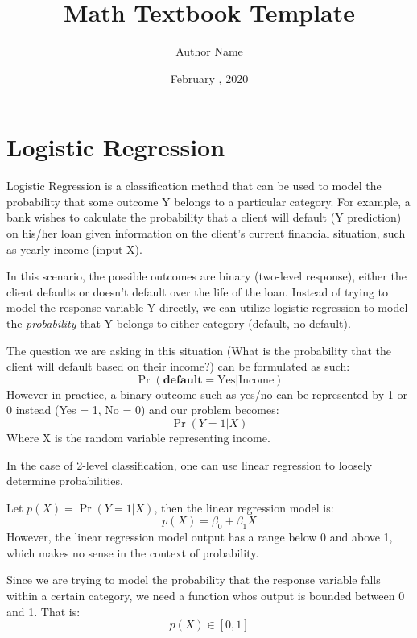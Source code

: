 \documentclass{article}
\title{Math Textbook Template}
\author{Author Name}
\date{February \nth{16}, 2020}
\numberwithin{equation}{subsection}
\begin{document}
\maketitle
\tableofcontents 
\newpage 

\section{Logistic Regression}
Logistic Regression is a classification method that can 
be used to model the probability that some outcome Y belongs to
a particular category.
For example, a bank wishes to calculate the probability that a
client will default (Y prediction) on his/her loan given information on
the client's current financial situation, such as yearly income (input X).

In this scenario, the possible outcomes are binary (two-level response), 
either the client defaults or doesn't default 
over the life of the loan. Instead of trying to model the response
variable Y directly, we can utilize logistic regression to model 
the \textit{probability} that Y belongs to either category (default, 
no default).

The question we are asking in this situation (What is the probability that
the client will default based on their income?) can be formulated as such:
\begin{equation}
\Pr(\textbf{default} = \text{Yes} | \text{Income}) \label{prdefault}
\end{equation}
However in practice, a binary outcome such as yes/no can be represented by 1
or 0 instead (Yes = 1, No = 0) and our problem becomes:
\begin{equation}
\Pr(Y = 1 | X)
\end{equation}
Where X is the random variable representing income.

In the case of 2-level classification, one can use linear regression to loosely determine
probabilities.

Let $p(X) = \Pr(Y=1|X)$, then the linear regression model is:
\begin{equation}
p(X) = \beta_0 + \beta_1X
\end{equation}
However, the linear regression model output has a range below 0 and above 1,
which makes no sense in the context of probability. 

Since we are trying to model the probability that the response variable falls within a 
certain category, we need a function whos output is bounded between 0 and 1. That is:
\begin{equation}
p(X) \in [0,1]
\end{equation}
\end{document}
